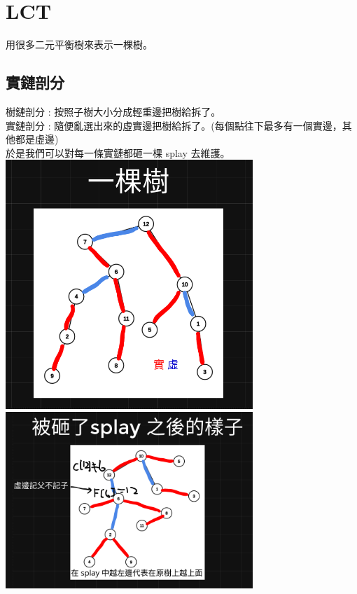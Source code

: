     \section{LCT}
    用很多二元平衡樹來表示一棵樹。
        \subsection{實鏈剖分}
        樹鏈剖分 : 按照子樹大小分成輕重邊把樹給拆了。\\
        實鏈剖分 : 隨便亂選出來的虛實邊把樹給拆了。(每個點往下最多有一個實邊，其他都是虛邊)\\
        於是我們可以對每一條實鏈都砸一棵 splay 去維護。\\
        \includegraphics*[width = 0.7\textwidth]{images/RITree} \\
        \includegraphics*[width = 0.7\textwidth]{images/RISplay} \\
